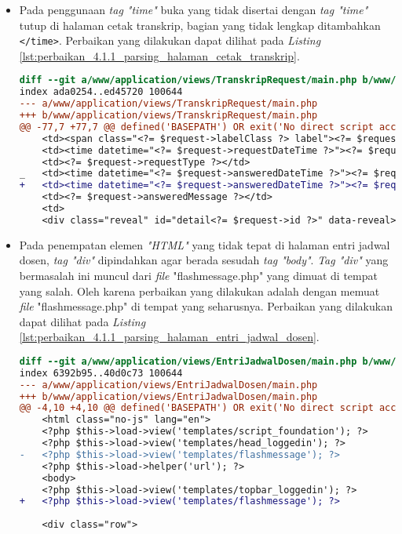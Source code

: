 \begin{itemize}
\item Pada penggunaan \textit{tag "time"} buka yang tidak disertai dengan \textit{tag "time"} tutup di halaman cetak transkrip, bagian yang tidak lengkap ditambahkan \texttt{</time>}. Perbaikan yang dilakukan dapat dilihat pada \textit{Listing} \ref{lst:perbaikan_4.1.1_parsing_halaman_cetak_transkrip}.
\begin{lstlisting}[frame=single, label={lst:perbaikan_4.1.1_parsing_halaman_cetak_transkrip}, language=diff, caption=Perbaikan Kriteria Sukses 4.1.1 pada Halaman Cetak Transkrip]
diff --git a/www/application/views/TranskripRequest/main.php b/www/application/views/TranskripRequest/main.php
index ada0254..ed45720 100644
--- a/www/application/views/TranskripRequest/main.php
+++ b/www/application/views/TranskripRequest/main.php
@@ -77,7 +77,7 @@ defined('BASEPATH') OR exit('No direct script access allowed');
    <td><span class="<?= $request->labelClass ?> label"><?= $request->status ?></span></td>
    <td><time datetime="<?= $request->requestDateTime ?>"><?= $request->requestDateString ?></time></td>
    <td><?= $request->requestType ?></td>
_   <td><time datetime="<?= $request->answeredDateTime ?>"><?= $request->answeredDateString ?></td>
+   <td><time datetime="<?= $request->answeredDateTime ?>"><?= $request->answeredDateString ?></time></td>
    <td><?= $request->answeredMessage ?></td>
    <td>
    <div class="reveal" id="detail<?= $request->id ?>" data-reveal>
\end{lstlisting} 

\item Pada penempatan elemen \textit{"HTML"} yang tidak tepat di halaman entri jadwal dosen, \textit{tag "div"} dipindahkan agar berada sesudah \textit{tag "body"}. \textit{Tag "div"} yang bermasalah ini muncul dari \textit{file} "flashmessage.php" yang dimuat di tempat yang salah. Oleh karena perbaikan yang dilakukan adalah dengan memuat \textit{file} "flashmessage.php" di tempat yang seharusnya. Perbaikan yang dilakukan dapat dilihat pada \textit{Listing} \ref{lst:perbaikan_4.1.1_parsing_halaman_entri_jadwal_dosen}.
\begin{lstlisting}[frame=single, label={lst:perbaikan_4.1.1_parsing_halaman_entri_jadwal_dosen}, language=diff, caption=Perbaikan Kriteria Sukses 4.1.1 pada Halaman Entri Jadwal Dosen]
diff --git a/www/application/views/EntriJadwalDosen/main.php b/www/application/views/EntriJadwalDosen/main.php
index 6392b95..40d0c73 100644
--- a/www/application/views/EntriJadwalDosen/main.php
+++ b/www/application/views/EntriJadwalDosen/main.php
@@ -4,10 +4,10 @@ defined('BASEPATH') OR exit('No direct script access allowed');
    <html class="no-js" lang="en">
    <?php $this->load->view('templates/script_foundation'); ?>
    <?php $this->load->view('templates/head_loggedin'); ?>
-	<?php $this->load->view('templates/flashmessage'); ?>
    <?php $this->load->helper('url'); ?>
    <body>
    <?php $this->load->view('templates/topbar_loggedin'); ?>
+   <?php $this->load->view('templates/flashmessage'); ?>
 
    <div class="row">
\end{lstlisting} 
\end{itemize}

